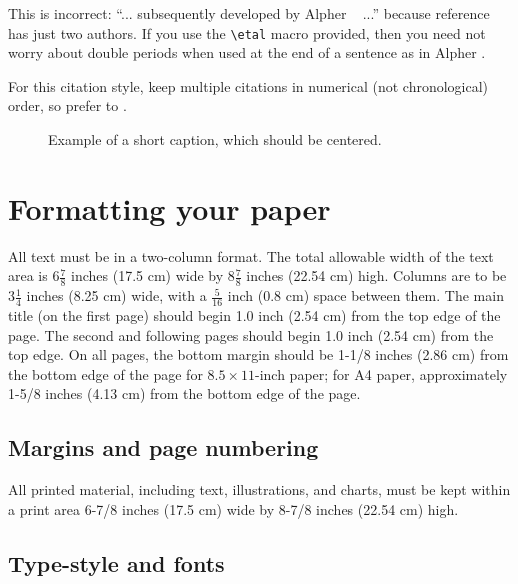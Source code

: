 \documentclass[10pt,twocolumn,letterpaper]{article}
\begin{document}
This is incorrect: ``... subsequently developed by Alpher \etal~\cite{Alpher03} ...''
because reference~\cite{Alpher03} has just two authors.  If you use the
\verb'\etal' macro provided, then you need not worry about double periods
when used at the end of a sentence as in Alpher \etal.

For this citation style, keep multiple citations in numerical (not
chronological) order, so prefer \cite{Alpher03,Alpher02,Authors14} to
\cite{Alpher02,Alpher03,Authors14}.


\begin{figure*}
\begin{center}
\fbox{\rule{0pt}{2in} \rule{.9\linewidth}{0pt}}
\end{center}
   \caption{Example of a short caption, which should be centered.}
\label{fig:short}
\end{figure*}

\section{Formatting your paper}

All text must be in a two-column format. The total allowable width of the
text area is $6\frac78$ inches (17.5 cm) wide by $8\frac78$ inches (22.54
cm) high. Columns are to be $3\frac14$ inches (8.25 cm) wide, with a
$\frac{5}{16}$ inch (0.8 cm) space between them. The main title (on the
first page) should begin 1.0 inch (2.54 cm) from the top edge of the
page. The second and following pages should begin 1.0 inch (2.54 cm) from
the top edge. On all pages, the bottom margin should be 1-1/8 inches (2.86
cm) from the bottom edge of the page for $8.5 \times 11$-inch paper; for A4
paper, approximately 1-5/8 inches (4.13 cm) from the bottom edge of the
page.

\subsection{Margins and page numbering}

All printed material, including text, illustrations, and charts, must be kept
within a print area 6-7/8 inches (17.5 cm) wide by 8-7/8 inches (22.54 cm)
high.



\subsection{Type-style and fonts}
\end{document}
